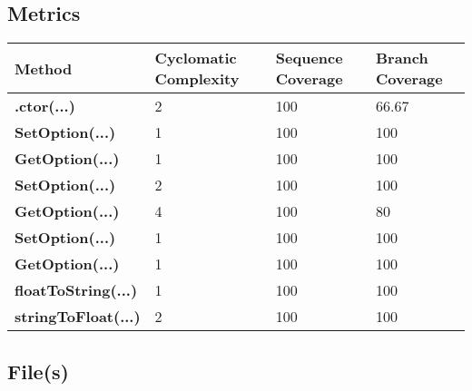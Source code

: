 \documentclass[a4paper,10pt]{article}
\begin{document}
\subsection{Metrics}
\begin{longtable}[l]{|l|l|l|l|}
\hline
\textbf{Method} & \textbf{Cyclomatic Complexity} & \textbf{Sequence Coverage} & \textbf{Branch Coverage}\\
\hline
\textbf{.ctor(...)} & 2 & 100 & 66.67\\
\hline
\textbf{SetOption(...)} & 1 & 100 & 100\\
\hline
\textbf{GetOption(...)} & 1 & 100 & 100\\
\hline
\textbf{SetOption(...)} & 2 & 100 & 100\\
\hline
\textbf{GetOption(...)} & 4 & 100 & 80\\
\hline
\textbf{SetOption(...)} & 1 & 100 & 100\\
\hline
\textbf{GetOption(...)} & 1 & 100 & 100\\
\hline
\textbf{floatToString(...)} & 1 & 100 & 100\\
\hline
\textbf{stringToFloat(...)} & 2 & 100 & 100\\
\hline
\end{longtable}
\subsection{File(s)}
\end{document}
